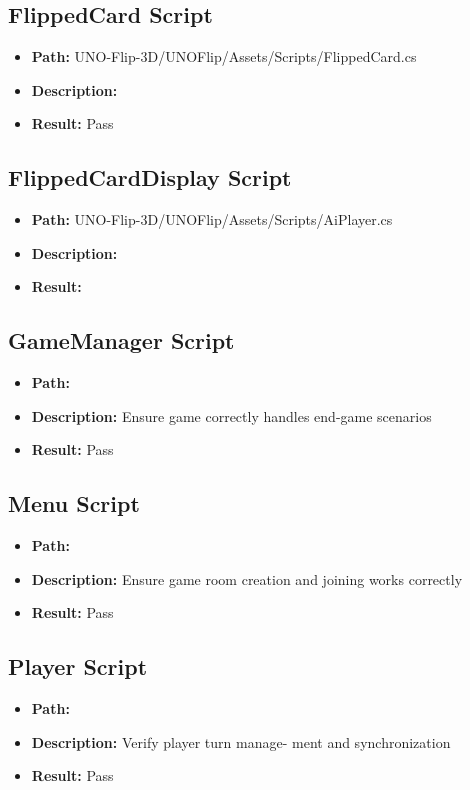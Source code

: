 \documentclass[12pt, titlepage]{article}
\begin{document}
\subsection{FlippedCard Script}
\begin{itemize}
    \item \textbf{Path:} UNO-Flip-3D/UNOFlip/Assets/Scripts/FlippedCard.cs
    \item \textbf{Description:} 
    \item \textbf{Result:} Pass
\end{itemize}

\subsection{FlippedCardDisplay Script}
\begin{itemize}
    \item \textbf{Path:} UNO-Flip-3D/UNOFlip/Assets/Scripts/AiPlayer.cs
    \item \textbf{Description:} 
    \item \textbf{Result:}
\end{itemize}

\subsection{GameManager Script}
\begin{itemize}
    \item \textbf{Path:} 
    \item \textbf{Description:} Ensure game correctly handles
end-game scenarios 
    \item \textbf{Result:} Pass
\end{itemize}

\subsection{Menu Script}
\begin{itemize}
    \item \textbf{Path:} 
    \item \textbf{Description:} Ensure game room creation
and joining works correctly
    \item \textbf{Result:} Pass
\end{itemize}

\subsection{Player Script}
\begin{itemize}
    \item \textbf{Path:} 
    \item \textbf{Description:} Verify player turn manage-
ment and synchronization 
    \item \textbf{Result:} Pass
\end{itemize}
\end{document}
